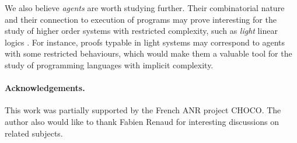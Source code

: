 \documentclass{article}
\begin{document}
We also believe \emph{agents} are worth studying further. Their combinatorial nature and their connection to execution of programs may prove interesting for the study of higher order systems with restricted complexity, 
such as \emph{light} linear logics \cite{DBLP:journals/iandc/Girard98}. For instance, proofs typable in light systems may correspond to agents with some restricted behaviours, which would make them a valuable tool for 
the study of programming languages with implicit complexity.

\paragraph{Acknowledgements.} This work was partially supported by the French ANR project CHOCO. The author also would like to thank Fabien Renaud for interesting discussions on related subjects.
\end{document}
